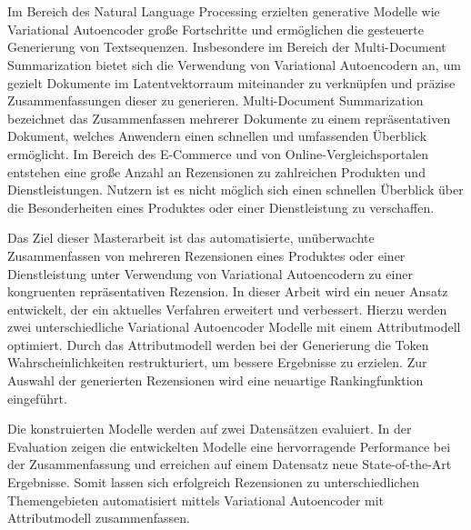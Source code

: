 \section*{}
Im Bereich des Natural Language Processing erzielten generative Modelle wie Variational Autoencoder große Fortschritte und ermöglichen die gesteuerte Generierung von Textsequenzen.
Insbesondere im Bereich der Multi-Document Summarization bietet sich die Verwendung von Variational Autoencodern an, um gezielt Dokumente im Latentvektorraum miteinander zu verknüpfen und präzise Zusammenfassungen dieser zu generieren.
Multi-Document Summarization bezeichnet das Zusammenfassen mehrerer Dokumente zu einem repräsentativen Dokument, welches Anwendern einen schnellen und umfassenden Überblick ermöglicht.
Im Bereich des E-Commerce und von Online-Vergleichsportalen entstehen eine große Anzahl an Rezensionen zu zahlreichen Produkten und Dienstleistungen.
Nutzern ist es nicht möglich sich einen schnellen Überblick über die Besonderheiten eines Produktes oder einer Dienstleistung zu verschaffen.

Das Ziel dieser Masterarbeit ist das automatisierte, unüberwachte Zusammenfassen von mehreren Rezensionen eines Produktes oder einer Dienstleistung unter Verwendung von Variational Autoencodern zu einer kongruenten repräsentativen Rezension.
In dieser Arbeit wird ein neuer Ansatz entwickelt, der ein aktuelles Verfahren erweitert und verbessert.
Hierzu werden zwei unterschiedliche Variational Autoencoder Modelle mit einem Attributmodell optimiert.
Durch das Attributmodell werden bei der Generierung die Token Wahrscheinlichkeiten restrukturiert, um bessere Ergebnisse zu erzielen.
Zur Auswahl der generierten Rezensionen wird eine neuartige Rankingfunktion eingeführt.

Die konstruierten Modelle werden auf zwei Datensätzen evaluiert.
In der Evaluation zeigen die entwickelten Modelle eine hervorragende Performance bei der Zusammenfassung und erreichen auf einem Datensatz neue State-of-the-Art Ergebnisse.
Somit lassen sich erfolgreich Rezensionen zu unterschiedlichen Themengebieten automatisiert mittels Variational Autoencoder mit Attributmodell zusammenfassen.





